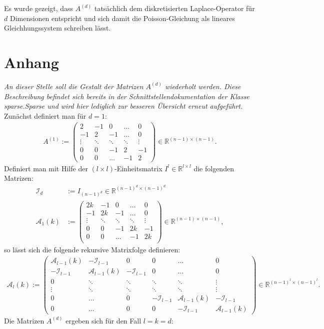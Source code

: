 \documentclass[smallheadings]{scrartcl}
\numberwithin{equation}{section}
\begin{document}
Es wurde gezeigt, dass $A^{(d)}$ tatsächlich dem diskretisierten Laplace-Operator für $d$ Dimensionen entspricht und sich damit die Poisson-Gleichung als lineares Gleichhungssystem schreiben lässt. 

\cleardoublepage
\appendix
\section{Anhang}\label{sec:anhang}
\emph{An dieser Stelle soll die Gestalt der Matrizen $A^{(d)}$ wiederholt werden. Diese Beschreibung befindet sich bereits in der Schnittstellendokumentation der Klasse \emph{sparse.Sparse} und wird hier lediglich zur besseren Übersicht erneut aufgeführt.}\newline
\newline
Zunächst definiert man für $d=1$:
\begin{align}
A^{(1)}:= 
\begin{pmatrix}
2 & -1 & 0 & \dots & 0\\
-1 & 2 & -1 & \dots & 0\\
\vdots & \ddots & \ddots & \ddots & \vdots\\
0 & 0 & -1 & 2 & -1\\
0 & 0 & \dots & -1 & 2
\end{pmatrix}\in \mathbb{R}^{(n-1)\times(n-1)}.
\label{eq:a_1_def}
\end{align}
Definiert man mit Hilfe der $(l\times l)$-Einheitsmatrix $I^l\in \mathbb{R}^{l\times l}$ die folgenden Matrizen:
\begin{align}
\mathcal{I}_d&:=I_{(n-1)^d}\in\mathbb{R}^{(n-1)^d\times(n-1)^d}\\
\mathcal{A}_1(k)&:=
\begin{pmatrix}
2k & -1 & 0 & \dots & 0\\
-1 & 2k & -1 & \dots & 0\\
\vdots & \ddots & \ddots & \ddots & \vdots \\
0 & 0 & -1 & 2k & -1\\
0 & 0 & \dots & -1 & 2k\\
\end{pmatrix} \in \mathbb{R}^{(n-1)\times(n-1)},
\end{align}
so lässt sich die folgende rekursive Matrixfolge definieren:
\begin{align}
\mathcal{A}_l(k):=
\begin{pmatrix}
\mathcal{A}_{l-1}(k) & -\mathcal{I}_{l-1} & 0 & 0 & \dots & 0\\
-\mathcal{I}_{l-1} & \mathcal{A}_{l-1}(k) & -\mathcal{I}_{l-1} & 0 & \dots & 0\\
0 & \ddots & \ddots & \ddots & \ddots & \vdots \\
\vdots & \ddots & \ddots & \ddots & \ddots & \vdots \\
0 & \dots & 0 & -\mathcal{I}_{l-1} & \mathcal{A}_{l-1}(k) & -\mathcal{I}_{l-1} \\
0 & \dots & 0 & 0 & -\mathcal{I}_{l-1} & \mathcal{A}_{l-1}(k)
\end{pmatrix} \in \mathbb{R}^{(n-1)^l\times(n-1)^l}.
\end{align}
Die Matrizen $A^{(d)}$ ergeben sich für den Fall $l=k=d$:
\end{document}

